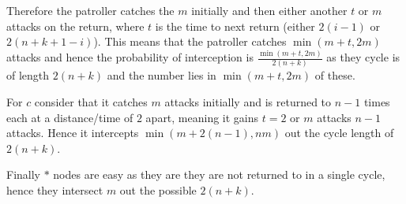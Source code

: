 \documentclass[a4paper,10pt]{article}
\theoremstyle{definition}
\theoremstyle{definition}
\theoremstyle{remark}
\theoremstyle{definition}
\begin{document}
Therefore the patroller catches the $m$ initially and then either another $t$ or $m$ attacks on the return, where $t$ is the time to next return (either $2(i-1)$ or $2(n+k+1-i)$). This means that the patroller catches $\min(m+t,2m)$ attacks and hence the probability of interception is $\frac{\min(m+t,2m)}{2(n+k)}$ as they cycle is of length $2(n+k)$ and the number lies in $\min(m+t,2m)$ of these.

For $c$ consider that it catches $m$ attacks initially and is returned to $n-1$ times each at a distance/time of $2$ apart, meaning it gains $t=2$ or $m$ attacks $n-1$ attacks. Hence it intercepts $\min(m+2(n-1),nm)$ out the cycle length of $2(n+k)$.

Finally $*$ nodes are easy as they are they are not returned to in a single cycle, hence they intersect $m$ out the possible $2(n+k)$.
\end{document}
